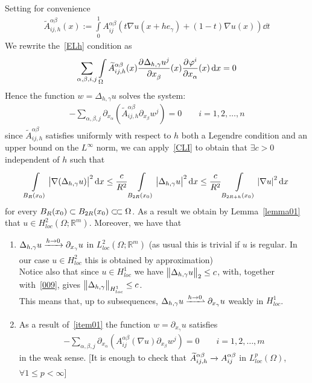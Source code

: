 Setting for convenience
\begin{gather}
	\widetilde{A}_{ij,h}^{\alpha \beta }(x):=  \int\limits_{0}^{1} A_{ij}^{\alpha \beta } \left( t\nabla u(x+h e_{\gamma }) +(1-t) \nabla u(x) \right) \dd{t}
\end{gather}
We rewrite the~\eqref{ELh} condition as
\begin{gather}
	\sum\limits_{\alpha, \beta , i,j}^{} \int\limits_{\Omega}^{} \widetilde{A}_{ij,h}^{\alpha \beta }(x) \pdv[]{\Delta _{h, \gamma } u^{j}}{x_{\beta }}\/(x) \pdv[]{\varphi ^{i}}{x_{\alpha }}\/(x)   \dd{x} = 0
\end{gather}
Hence the function \( w = \Delta _{h, \gamma } u \) solves the system:
\begin{gather}
	- \sum\limits_{\alpha, \beta , j}^{} \partial_{x_{\alpha }} \left( \widetilde{A}_{ij,h}^{\alpha \beta } \partial_{x_{\beta }}w^{j} \right) = 0\qquad i=1,2,\ldots,n
\end{gather}
since \( \widetilde{A}_{ij,h}^{\alpha \beta } \) satisfies uniformly with respect to \( h \) both a Legendre condition and an upper bound on the \( L^{\infty } \) norm, we can apply~\eqref{CLI} to obtain that \( \exists c>0 \) independent of \( h \) such that
\begin{gather}
	\int\limits_{B_{R}(x_{0})}^{} \abs{\nabla (\Delta _{h, \gamma }u) }^{2} \dd{x} \leq  \frac{c}{R^{2}} \int\limits_{B_{2R}(x_{0})}^{} \abs{\Delta _{h, \gamma }u}^{2} \dd{x} \leq  \frac{c}{R^{2}} \int\limits_{B_{2R+h}(x_{0}) }^{} \abs{\nabla u}^{2} \dd{x} \label{009}
\end{gather}
for every \( B_{R}(x_{0}) \subset B_{2R}(x_{0}) \ssubset \Omega  \). As a result we obtain by Lemma~\ref{lemma01} that \( u \in H_{loc}^{2}(\Omega ; \mathbb{R}^{m})  \). Moreover, we have that
\begin{enumerate}[label= (\roman*)]
	\item\label{item01} \( \Delta _{h, \gamma } u \myxrightarrow[]{h \to 0} \partial_{x_{\gamma }}u \) in \( L_{loc}^{2}(\Omega ; \mathbb{R}^{m})  \) (as usual this is trivial if \( u \) is regular. In our case \( u \in  H_{loc}^{2} \) this is obtained by approximation) \\
	Notice also that since \( u \in H_{loc}^{1} \) we have \( \norm{\Delta _{h, \gamma }u}_{2} \leq c \), with, together with~\eqref{009}, gives \( \norm{\Delta _{h, \gamma }}_{H_{loc}^{1}}\leq c \). \\
	This means that, up to subsequences, \( \Delta _{h, \gamma }u \myxrightharpoonup[]{h \to 0} \partial_{x_{\gamma }}u \) weakly in \( H_{loc}^{1} \).
	\item As a result of~\ref{item01} the function \( w = \partial_{x_{\gamma }}u \) satisfies
	      \begin{gather}
		      - \sum\limits_{\alpha ,\beta ,j}^{} \partial_{x_{\alpha }} \left( A_{ij}^{\alpha \beta }(\nabla u) \partial_{x_{\beta }} w^{j} \right) = 0 \qquad i=1,2,\ldots,m
	      \end{gather}
	      in the weak sense. [It is enough to check that \( \widetilde{A}_{ij,h}^{\alpha \beta } \myxrightarrow[]{} A_{ij}^{\alpha \beta }\) in \( L_{loc}^{p}(\Omega ) \), \( \forall 1 \leq p < \infty \)]
\end{enumerate}

